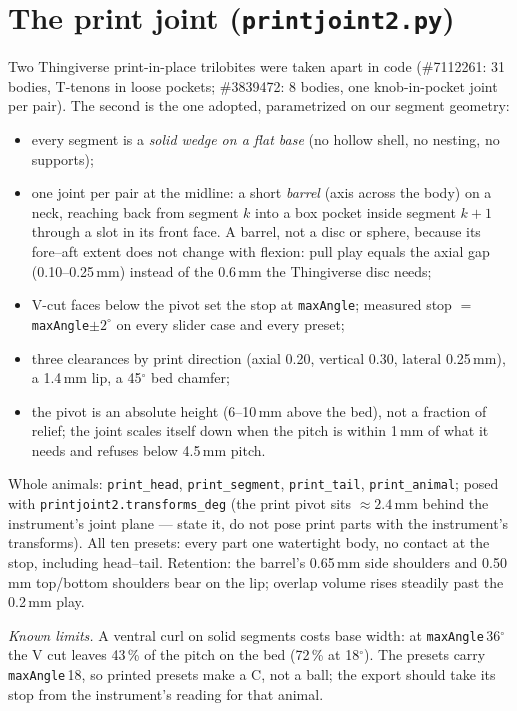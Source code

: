 \documentclass[11pt]{article}
\newcommand{\code}[1]{\texttt{#1}}
\begin{document}
\section{The print joint (\code{printjoint2.py})}
Two Thingiverse print-in-place trilobites were taken apart in code (\#7112261: 31 bodies, T-tenons in loose pockets; \#3839472: 8 bodies, one knob-in-pocket joint per pair). The second is the one adopted, parametrized on our segment geometry:
\begin{itemize}\itemsep2pt
\item every segment is a \emph{solid wedge on a flat base} (no hollow shell, no nesting, no supports);
\item one joint per pair at the midline: a short \emph{barrel} (axis across the body) on a neck, reaching back from segment \(k\) into a box pocket inside segment \(k{+}1\) through a slot in its front face. A barrel, not a disc or sphere, because its fore--aft extent does not change with flexion: pull play equals the axial gap (0.10--0.25\,mm) instead of the 0.6\,mm the Thingiverse disc needs;
\item V-cut faces below the pivot set the stop at \code{maxAngle}; measured stop \(=\)\code{maxAngle}\(\pm2^\circ\) on every slider case and every preset;
\item three clearances by print direction (axial 0.20, vertical 0.30, lateral 0.25\,mm), a 1.4\,mm lip, a 45\(^\circ\) bed chamfer;
\item the pivot is an absolute height (6--10\,mm above the bed), not a fraction of relief; the joint scales itself down when the pitch is within 1\,mm of what it needs and refuses below 4.5\,mm pitch.
\end{itemize}
Whole animals: \code{print\_head}, \code{print\_segment}, \code{print\_tail}, \code{print\_animal}; posed with \code{printjoint2.transforms\_deg} (the print pivot sits \(\approx2.4\)\,mm behind the instrument's joint plane --- state it, do not pose print parts with the instrument's transforms). All ten presets: every part one watertight body, no contact at the stop, including head--tail. Retention: the barrel's 0.65\,mm side shoulders and 0.50\,mm top/bottom shoulders bear on the lip; overlap volume rises steadily past the 0.2\,mm play.

\emph{Known limits.} A ventral curl on solid segments costs base width: at \code{maxAngle}\,36\(^\circ\) the V cut leaves 43\,\% of the pitch on the bed (72\,\% at 18\(^\circ\)). The presets carry \code{maxAngle}\,18, so printed presets make a C, not a ball; the export should take its stop from the instrument's reading for that animal.
\end{document}
